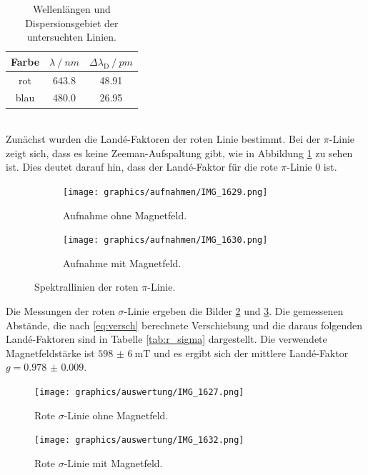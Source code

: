 \begin{table}[h]
  \centering
  \caption{Wellenlängen und Dispersionsgebiet der untersuchten Linien.}
  \label{tab:disp}
  \begin{tabular}{c S[table-format=3.1] S[table-format=2.2]}
    \toprule
    Farbe & {$\lambda\:/\:\si{nm}$} & {$\Delta\lambda_\text{D}\:/\:\si{pm}$} \\
    \midrule
    rot  & 643.8 & 48.91 \\
    blau & 480.0   & 26.95 \\
    \bottomrule
  \end{tabular}
\end{table}
%
\ \\
Zunächst wurden die Landé-Faktoren der roten Linie bestimmt. Bei der $\pi$-Linie zeigt sich, dass es keine Zeeman-Aufspaltung gibt, wie in Abbildung \ref{fig:r_pi} zu sehen ist. Dies deutet
darauf hin, dass der Landé-Faktor für die rote $\pi$-Linie 0 ist.
\begin{figure}
  \centering
  \begin{subfigure}{0.48\textwidth}
    \centering
    \texttt{[image: graphics/aufnahmen/IMG\_1629.png]}
    \caption{Aufnahme ohne Magnetfeld.}
  \end{subfigure}
  \begin{subfigure}{0.48\textwidth}
    \centering
    \texttt{[image: graphics/aufnahmen/IMG\_1630.png]}
    \caption{Aufnahme mit Magnetfeld.}
  \end{subfigure}
  \caption{Spektrallinien der roten $\pi$-Linie.}
  \label{fig:r_pi}
\end{figure}

Die Messungen der roten $\sigma$-Linie ergeben die Bilder \ref{fig:r_sigma} und \ref{fig:r_sigma_B}. Die gemessenen Abstände, die nach \eqref{eq:versch} berechnete Verschiebung
und die daraus folgenden Landé-Faktoren sind in Tabelle \ref{tab:r_sigma} dargestellt. Die verwendete Magnetfeldstärke ist $\SI{598(6)}{\milli\tesla}$ und es ergibt sich der mittlere
Landé-Faktor $g = \num{0.978(9)}$.

\begin{figure}
  \centering
  \texttt{[image: graphics/auswertung/IMG\_1627.png]}
  \caption{Rote $\sigma$-Linie ohne Magnetfeld.}
  \label{fig:r_sigma}
\end{figure}
\begin{figure}
  \centering
  \texttt{[image: graphics/auswertung/IMG\_1632.png]}
  \caption{Rote $\sigma$-Linie mit Magnetfeld.}
  \label{fig:r_sigma_B}
\end{figure}

